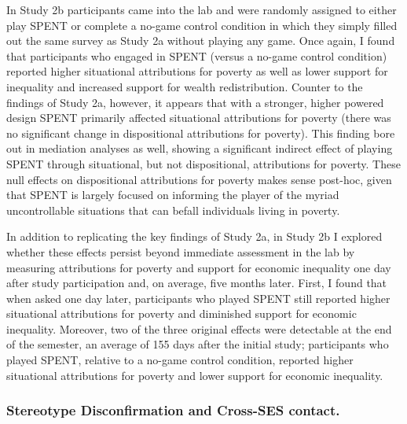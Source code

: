 \documentclass{sfuthesis}
\begin{document}
In Study 2b participants came into the lab and were randomly assigned to either play SPENT or complete a no-game control condition in which they simply filled out the same survey as Study 2a without playing any game. Once again, I found that participants who engaged in SPENT (versus a no-game control condition) reported higher situational attributions for poverty as well as lower support for inequality and increased support for wealth redistribution. Counter to the findings of Study 2a, however, it appears that with a stronger, higher powered design SPENT primarily affected situational attributions for poverty (there was no significant change in dispositional attributions for poverty). This finding bore out in mediation analyses as well, showing a significant indirect effect of playing SPENT through situational, but not dispositional, attributions for poverty. These null effects on dispositional attributions for poverty makes sense post-hoc, given that SPENT is largely focused on informing the player of the myriad uncontrollable situations that can befall individuals living in poverty.
	
In addition to replicating the key findings of Study 2a, in Study 2b I explored whether these effects persist beyond immediate assessment in the lab by measuring attributions for poverty and support for economic inequality one day after study participation and, on average, five months later. First, I found that when asked one day later, participants who played SPENT still reported higher situational attributions for poverty and diminished support for economic inequality. Moreover, two of the three original effects were detectable at the end of the semester, an average of 155 days after the initial study; participants who played SPENT, relative to a no-game control condition, reported higher situational attributions for poverty and lower support for economic inequality. 

\subsubsection{Stereotype Disconfirmation and Cross-SES contact.}
\end{document}
